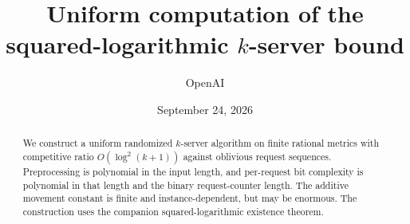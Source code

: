 \documentclass[11pt]{article}
\title{Uniform computation of the\\squared-logarithmic \(k\)-server bound}
\author{OpenAI}
\date{September 24, 2026}
\theoremstyle{definition}
\theoremstyle{remark}
\begin{document}
\maketitle
\begin{abstract}
We construct a uniform randomized \(k\)-server algorithm on finite rational
metrics with competitive ratio \(O(\log^2(k+1))\) against oblivious request
sequences. Preprocessing is polynomial in the input length, and per-request
bit complexity is polynomial in that length and the binary request-counter
length. The additive movement constant is finite and instance-dependent,
but may be enormous. The construction uses the companion squared-logarithmic
existence theorem.
\end{abstract}







\end{document}
